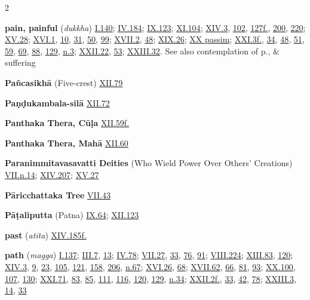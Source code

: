 \begin{multicols}{2}
\begin{vismHanging}
\par\textbf{pain, painful} (\emph{dukkha}) \hyperlink{I.140}{I.140}{}; \hyperlink{IV.184}{IV.184}{}; \hyperlink{IX.123}{IX.123}{}; \hyperlink{XI.104}{XI.104}{}; \hyperlink{XIV.3}{XIV.3}{}, \hyperlink{XIV.102}{102}{}, \hyperlink{XIV.127}{127f.}{}, \hyperlink{XIV.200}{200}{}, \hyperlink{XIV.220}{220}{}; \hyperlink{XV.28}{XV.28}{}; \hyperlink{XVI.1}{XVI.1}{}, \hyperlink{XVI.10}{10}{}, \hyperlink{XVI.31}{31}{}, \hyperlink{XVI.50}{50}{}, \hyperlink{XVI.99}{99}{}; \hyperlink{XVII.2}{XVII.2}{}, \hyperlink{XVII.48}{48}{}; \hyperlink{XIX.26}{XIX.26}{}; \hyperlink{XX}{XX passim}{}; \hyperlink{XXI.3}{XXI.3f.}{}, \hyperlink{XXI.34}{34}{}, \hyperlink{XXI.48}{48}{}, \hyperlink{XXI.51}{51}{}, \hyperlink{XXI.59}{59}{}, \hyperlink{XXI.69}{69}{}, \hyperlink{XXI.88}{88}{}, \hyperlink{XXI.129}{129}{}, \hyperlink{XXI.n3}{n.3}{}; \hyperlink{XXII.22}{XXII.22}{}, \hyperlink{XXII.53}{53}{}; \hyperlink{XXIII.32}{XXIII.32}{}. See also contemplation of p., \& suffering 
\par\textbf{Pañcasikhā} (Five-crest) \hyperlink{XII.79}{XII.79}{}
\par\textbf{Paṇḍukambala-silā} \hyperlink{XII.72}{XII.72}{}
\par\textbf{Panthaka Thera, Cūḷa} \hyperlink{XII.59}{XII.59f.}{}
\par\textbf{Panthaka Thera, Mahā} \hyperlink{XII.60}{XII.60}{}
\par\textbf{Paranimmitavasavatti Deities} (Who Wield Power Over Others’ Creations) \hyperlink{VII.n14}{VII.n.14}{}; \hyperlink{XIV.207}{XIV.207}{}; \hyperlink{XV.27}{XV.27}{}
\par\textbf{Pāricchattaka Tree} \hyperlink{VII.43}{VII.43}{}
\par\textbf{Pāṭaliputta} (Patna) \hyperlink{IX.64}{IX.64}{}; \hyperlink{XII.123}{XII.123}{}
\par\textbf{past} (\emph{atīta}) \hyperlink{XIV.185}{XIV.185f.}{}
\par\textbf{path} (\emph{magga}) \hyperlink{I.137}{I.137}{}; \hyperlink{III.7}{III.7}{}, \hyperlink{III.13}{13}{}; \hyperlink{IV.78}{IV.78}{}; \hyperlink{VII.27}{VII.27}{}, \hyperlink{VII.33}{33}{}, \hyperlink{VII.76}{76}{}, \hyperlink{VII.91}{91}{}; \hyperlink{VIII.224}{VIII.224}{}; \hyperlink{XIII.83}{XIII.83}{}, \hyperlink{XIII.120}{120}{}; \hyperlink{XIV.3}{XIV.3}{}, \hyperlink{XIV.9}{9}{}, \hyperlink{XIV.23}{23}{}, \hyperlink{XIV.105}{105}{}, \hyperlink{XIV.121}{121}{}, \hyperlink{XIV.158}{158}{}, \hyperlink{XIV.206}{206}{}, \hyperlink{XIV.n67}{n.67}{}; \hyperlink{XVI.26}{XVI.26}{}, \hyperlink{XVI.68}{68}{}; \hyperlink{XVII.62}{XVII.62}{}, \hyperlink{XVII.66}{66}{}, \hyperlink{XVII.81}{81}{}, \hyperlink{XVII.93}{93}{}; \hyperlink{XX.100}{XX.100}{}, \hyperlink{XX.107}{107}{}, \hyperlink{XX.130}{130}{}; \hyperlink{XXI.71}{XXI.71}{}, \hyperlink{XXI.83}{83}{}, \hyperlink{XXI.85}{85}{}, \hyperlink{XXI.111}{111}{}, \hyperlink{XXI.116}{116}{}, \hyperlink{XXI.120}{120}{}, \hyperlink{XXI.129}{129}{}, \hyperlink{XXI.n34}{n.34}{}; \hyperlink{XXII.2}{XXII.2f.}{}, \hyperlink{XXII.33}{33}{}, \hyperlink{XXII.42}{42}{}, \hyperlink{XXII.78}{78}{}; \hyperlink{XXIII.3}{XXIII.3}{}, \hyperlink{XXIII.14}{14}{}, \hyperlink{XXIII.33}{33}{}

\end{vismHanging}
\end{multicols}

